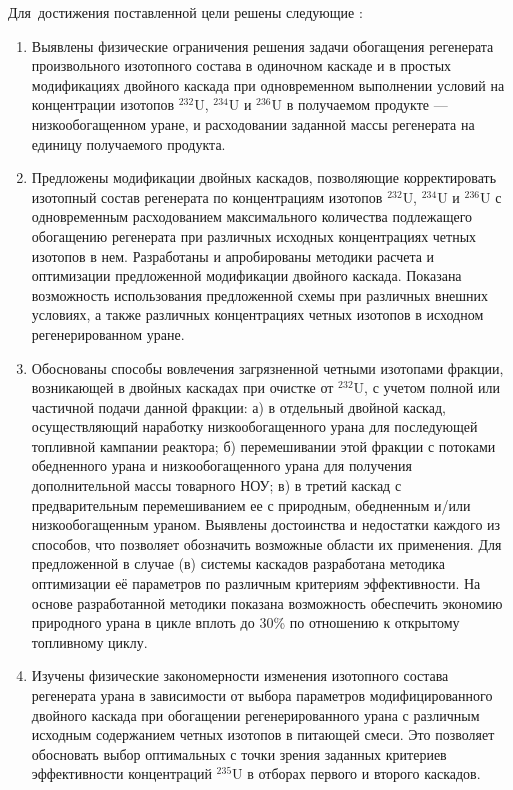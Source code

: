 Для~достижения поставленной цели решены следующие {\tasks}:
\begin{enumerate}
  \item Выявлены физические ограничения решения задачи обогащения регенерата произвольного изотопного состава в одиночном каскаде и в простых модификациях двойного каскада при одновременном выполнении условий на концентрации изотопов $^{232}$U, $^{234}$U и $^{236}$U в получаемом продукте --- низкообогащенном уране, и расходовании заданной массы регенерата на единицу получаемого продукта.
  \item Предложены модификации двойных каскадов, позволяющие корректировать изотопный состав регенерата по концентрациям изотопов $^{232}$U, $^{234}$U и $^{236}$U с одновременным расходованием максимального количества подлежащего обогащению регенерата при различных исходных концентрациях четных изотопов в нем. Разработаны и апробированы методики расчета и оптимизации предложенной модификации двойного каскада. Показана возможность использования предложенной схемы при различных внешних условиях, а также различных концентрациях четных изотопов в исходном регенерированном уране.
  \item Обоснованы способы вовлечения загрязненной четными изотопами фракции, возникающей в двойных каскадах при очистке от $^{232}$U, с учетом полной или частичной подачи данной фракции: а) в отдельный двойной каскад, осуществляющий наработку низкообогащенного урана для последующей топливной кампании реактора; б) перемешивании этой фракции с потоками обедненного урана и низкообогащенного урана для получения дополнительной массы товарного НОУ; в) в третий каскад с предварительным перемешиванием ее с природным, обедненным и/или низкообогащенным ураном. Выявлены достоинства и недостатки каждого из способов, что позволяет обозначить возможные области их применения. Для предложенной в случае (в) системы каскадов разработана методика оптимизации её параметров по различным критериям эффективности. На основе разработанной методики показана возможность обеспечить экономию природного урана в цикле вплоть до 30\% по отношению к открытому топливному циклу.
  \item Изучены физические закономерности изменения изотопного состава регенерата урана в зависимости от выбора параметров модифицированного двойного каскада при обогащении регенерированного урана с различным исходным содержанием четных изотопов в питающей смеси. Это позволяет обосновать выбор оптимальных с точки зрения заданных критериев эффективности концентраций $^{235}$U в отборах первого и второго каскадов.

\end{enumerate}

